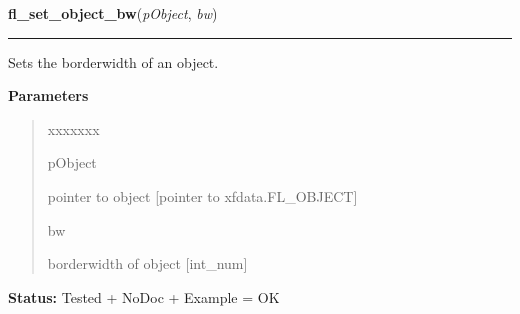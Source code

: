 \hspace{.8\funcindent}\begin{boxedminipage}{\funcwidth}

    \raggedright \textbf{fl\_set\_object\_bw}(\textit{pObject}, \textit{bw})

    \vspace{-1.5ex}

    \rule{\textwidth}{0.5\fboxrule}
\setlength{\parskip}{2ex}
    Sets the borderwidth of an object.

\setlength{\parskip}{1ex}
      \textbf{Parameters}
      \vspace{-1ex}

      \begin{quote}
        \begin{Ventry}{xxxxxxx}

          \item[pObject]

          pointer to object [pointer to xfdata.FL\_OBJECT]

          \item[bw]

          borderwidth of object [int\_num]

        \end{Ventry}

      \end{quote}

\textbf{Status:} Tested + NoDoc + Example = OK



    \end{boxedminipage}

    \label{xformslib:library:fl_get_object_bw}

    \vspace{0.5ex}

